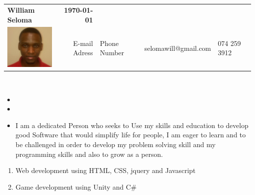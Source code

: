 %
\\ \\

\begin{tabular*}{6.5in}{l@{\extracolsep{\fill}}r}
\textbf{\Large } \textbf{William Seloma} & \textbf{\today} \\
\includegraphics{./images/william889} & E-mail
Adress & Phone Number & selomawill@gmail.com & 074 259 3912
\end{tabular*}
\\

\begin{itemize}

\item {}

\item {}

\end{itemize}


\begin{itemize}
 \item %
 I am a dedicated Person who seeks to Use my skills and education to develop good Software that would simplify life for people, I am eager to learn and to be challenged in order to develop my problem solving skill and my programming skills and also to grow as a person.
\end{itemize}



\begin{enumerate}
 \item Web development using HTML, CSS, jquery and Javascript 
 \item Game development using Unity and C#
\end{enumerate}

